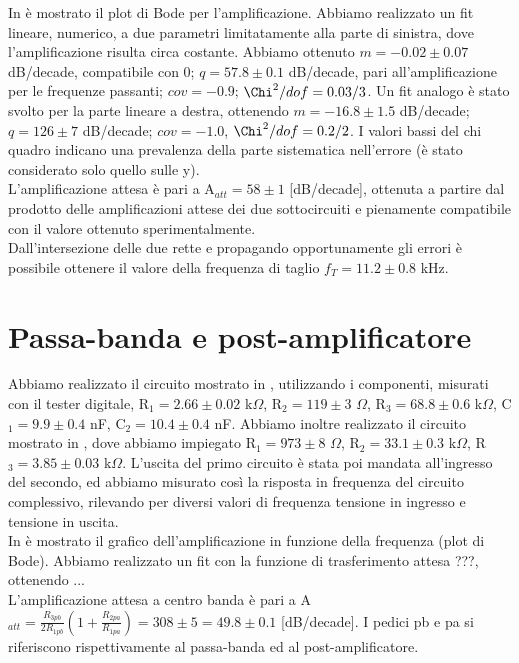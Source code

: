 In  è mostrato il plot di Bode per l'amplificazione. Abbiamo realizzato un fit lineare, numerico, a due parametri limitatamente alla parte di sinistra, dove l'amplificazione risulta circa costante. Abbiamo ottenuto $m = -0.02 \pm 0.07$ dB/decade, compatibile con 0; $q = 57.8 \pm 0.1$ dB/decade, pari all'amplificazione per le frequenze passanti; $cov = -0.9$; $\Chi^2/dof = 0.03/3$. Un fit analogo è stato svolto per la parte lineare a destra, ottenendo $m = -16.8 \pm 1.5$ dB/decade; $q = 126 \pm 7$ dB/decade; $cov = -1.0$, $\Chi^2/dof = 0.2/2$. I valori bassi del chi quadro indicano una prevalenza della parte sistematica nell'errore (è stato considerato solo quello sulle y).\\
L'amplificazione attesa è pari a A$_{att} = 58 \pm 1$ [dB/decade], ottenuta a partire dal prodotto delle amplificazioni attese dei due sottocircuiti e pienamente compatibile con il valore ottenuto sperimentalmente.\\
Dall'intersezione delle due rette e propagando opportunamente gli errori è possibile ottenere il valore della frequenza di taglio $f_T = 11.2 \pm 0.8$ kHz.

\section{Passa-banda e post-amplificatore}
Abbiamo realizzato il circuito mostrato in , utilizzando i componenti, misurati con il tester digitale, R$_1 = 2.66 \pm 0.02$ k$\Omega$, R$_2 = 119 \pm 3$ $\Omega$, R$_3 = 68.8 \pm 0.6$ k$\Omega$, C$_1 = 9.9 \pm 0.4$ nF, C$_2 = 10.4 \pm 0.4$ nF. Abbiamo inoltre realizzato il circuito mostrato in , dove abbiamo impiegato R$_1 = 973 \pm 8$ $\Omega$, R$_2 = 33.1 \pm 0.3$ k$\Omega$, R$_3 = 3.85 \pm 0.03$ k$\Omega$. L'uscita del primo circuito è stata poi mandata all'ingresso del secondo, ed abbiamo misurato così la risposta in frequenza del circuito complessivo, rilevando per diversi valori di frequenza tensione in ingresso e tensione in uscita.\\
In  è mostrato il grafico dell'amplificazione in funzione della frequenza (plot di Bode). Abbiamo realizzato un fit con la funzione di trasferimento attesa ???, ottenendo ...\\ %
L'amplificazione attesa a centro banda è pari a A$_{att} = \frac{R_{3pb}}{2R_{1pb}} (1+\frac{R_{2pa}}{R_{1pa}}) = 308 \pm 5 = 49.8 \pm 0.1$ [dB/decade]. I pedici pb e pa si riferiscono rispettivamente al passa-banda ed al post-amplificatore.